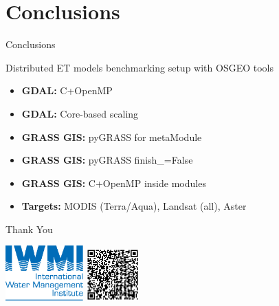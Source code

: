 \documentclass[xcolor=dvipsnames,beamer]{beamer} %
\begin{document}
\section{Conclusions}
\begin{frame}[fragile]{Conclusions}

\begin{block}{Distributed ET models benchmarking setup with OSGEO tools}
\begin{itemize}
 \item {\bf GDAL:} C+OpenMP
 \item {\bf GDAL:} Core-based scaling
 \item {\bf GRASS GIS:} pyGRASS for metaModule
 \item {\bf GRASS GIS:} pyGRASS finish\_=False
 \item {\bf GRASS GIS:} C+OpenMP inside modules
 \item {\bf Targets:} MODIS (Terra/Aqua), Landsat (all), Aster
\end{itemize}
\end{block}

\end{frame}

\begin{frame}[fragile]{Thank You}

\vspace{50mm}
\begin{flushright}
 \includegraphics[width=3cm]{iwmi}
 \hspace{10mm}
 \includegraphics[width=2cm]{etb_qr}
\end{flushright}

\end{frame}
\end{document}
